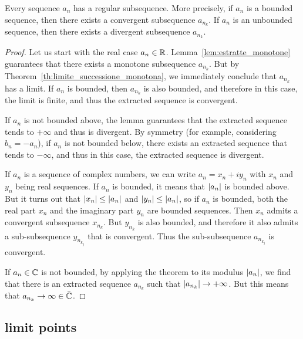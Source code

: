 \begin{theorem}\label{th:Bolzano}
\label{th:bolzano_weierstrass}%
\mymark{***}%
%
%
%
Every sequence $a_n$ has a regular subsequence.
More precisely, if $a_n$ is a bounded sequence,
then there exists a convergent subsequence
$a_{n_k}$.
If $a_n$ is an unbounded sequence, then
there exists a divergent subsequence $a_{n_k}$.
\end{theorem}
%
\begin{proof}
\mymark{***}
Let us start with the real case $a_n\in {\mathbb R}$.
Lemma~\ref{lem:estratte_monotone} guarantees
that there exists a monotone subsequence $a_{n_k}$.
But by Theorem~\ref{th:limite_successione_monotona}, we immediately conclude
that $a_{n_k}$ has a limit.
If $a_n$ is bounded, then $a_{n_k}$ is also bounded, and therefore
in this case, the limit is finite, and thus the extracted sequence is
convergent.

If $a_n$ is not bounded above, the lemma
guarantees that the extracted sequence tends to $+\infty$
and thus is divergent.
By symmetry (for example, considering $b_n=-a_n$), if $a_n$ is not bounded
below,
there exists an extracted sequence that tends to $-\infty$, and thus in
this case, the extracted sequence is divergent.

If $a_n$ is a sequence of complex numbers, we can write
$a_n = x_n + i y_n$ with
$x_n$ and $y_n$ being real sequences. If $a_n$ is bounded, it means that
${\left|a_n\right|}$
is bounded above. But it turns out that ${\left|x_n\right|} \le {\left|a_n\right|}$ and
${\left|y_n\right|}\le {\left|a_n\right|}$, so if $a_n$ is bounded, both the real part
$x_n$ and the imaginary part $y_n$ are bounded sequences.
Then $x_n$ admits a convergent subsequence $x_{n_k}$.
But $y_{n_k}$ is also bounded, and therefore it also admits a
sub-subsequence $y_{n_{k_j}}$ that is convergent.
Thus the sub-subsequence $a_{n_{k_j}}$ is convergent.

If $a_n\in {\mathbb C}$ is not bounded, by applying the theorem to its modulus
${\left|a_n\right|}$,
we find that there is an extracted sequence $a_{n_k}$ such that
${\left|a_{n_k}\right|}\to +\infty$.
But this means that $a_{n_k}\to \infty \in \bar {{\mathbb C}}$.
\end{proof}

\subsection{limit points}

